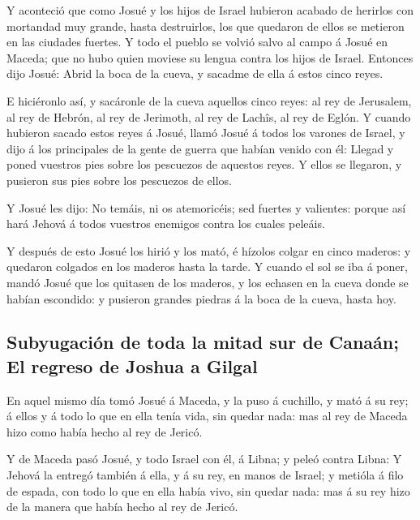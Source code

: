  Y aconteció que como Josué y los hijos de Israel
hubieron acabado de herirlos con mortandad muy grande, hasta
destruirlos, los que quedaron de ellos se metieron en las ciudades
fuertes.  Y todo el pueblo se volvió salvo al campo á
Josué en Maceda; que no hubo quien moviese su lengua contra los hijos de
Israel.  Entonces dijo Josué: Abrid la boca de la cueva,
y sacadme de ella á estos cinco reyes.

 E hiciéronlo así, y sacáronle de la cueva aquellos cinco
reyes: al rey de Jerusalem, al rey de Hebrón, al rey de Jerimoth, al rey
de Lachîs, al rey de Eglón.  Y cuando hubieron sacado
estos reyes á Josué, llamó Josué á todos los varones de Israel, y dijo á
los principales de la gente de guerra que habían venido con él: Llegad y
poned vuestros pies sobre los pescuezos de aquestos reyes. Y ellos se
llegaron, y pusieron sus pies sobre los pescuezos de ellos.

 Y Josué les dijo: No temáis, ni os atemoricéis; sed
fuertes y valientes: porque así hará Jehová á todos vuestros enemigos
contra los cuales peleáis.

 Y después de esto Josué los hirió y los mató, é hízolos
colgar en cinco maderos: y quedaron colgados en los maderos hasta la
tarde.  Y cuando el sol se iba á poner, mandó Josué que
los quitasen de los maderos, y los echasen en la cueva donde se habían
escondido: y pusieron grandes piedras á la boca de la cueva, hasta hoy.

\hypertarget{subyugaciuxf3n-de-toda-la-mitad-sur-de-canauxe1n-el-regreso-de-joshua-a-gilgal}{%
\subsection{Subyugación de toda la mitad sur de Canaán; El regreso de
Joshua a
Gilgal}\label{subyugaciuxf3n-de-toda-la-mitad-sur-de-canauxe1n-el-regreso-de-joshua-a-gilgal}}

 En aquel mismo día tomó Josué á Maceda, y la puso á
cuchillo, y mató á su rey; á ellos y á todo lo que en ella tenía vida,
sin quedar nada: mas al rey de Maceda hizo como había hecho al rey de
Jericó.

 Y de Maceda pasó Josué, y todo Israel con él, á Libna; y
peleó contra Libna:  Y Jehová la entregó también á ella,
y á su rey, en manos de Israel; y metióla á filo de espada, con todo lo
que en ella había vivo, sin quedar nada: mas á su rey hizo de la manera
que había hecho al rey de Jericó.

